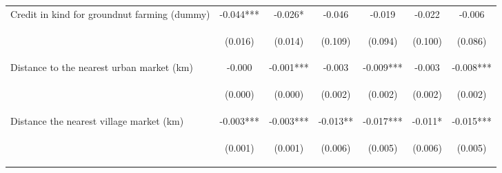 \begin{center}
\begin{tabular}{lcccccc}
Credit in kind for groundnut farming (dummy) & -0.044*** & -0.026* & -0.046 & -0.019 & -0.022 & -0.006 \\
\vspace{4pt} & \begin{footnotesize}(0.016)\end{footnotesize} & \begin{footnotesize}(0.014)\end{footnotesize} & \begin{footnotesize}(0.109)\end{footnotesize} & \begin{footnotesize}(0.094)\end{footnotesize} & \begin{footnotesize}(0.100)\end{footnotesize} & \begin{footnotesize}(0.086)\end{footnotesize} \\
Distance to the nearest urban market (km) & -0.000 & -0.001*** & -0.003 & -0.009*** & -0.003 & -0.008*** \\
\vspace{4pt} & \begin{footnotesize}(0.000)\end{footnotesize} & \begin{footnotesize}(0.000)\end{footnotesize} & \begin{footnotesize}(0.002)\end{footnotesize} & \begin{footnotesize}(0.002)\end{footnotesize} & \begin{footnotesize}(0.002)\end{footnotesize} & \begin{footnotesize}(0.002)\end{footnotesize} \\
Distance the nearest village market (km) & -0.003*** & -0.003*** & -0.013** & -0.017*** & -0.011* & -0.015*** \\
\vspace{4pt} & \begin{footnotesize}(0.001)\end{footnotesize} & \begin{footnotesize}(0.001)\end{footnotesize} & \begin{footnotesize}(0.006)\end{footnotesize} & \begin{footnotesize}(0.005)\end{footnotesize} & \begin{footnotesize}(0.006)\end{footnotesize} & \begin{footnotesize}(0.005)\end{footnotesize} \\

\end{tabular}
\end{center}
